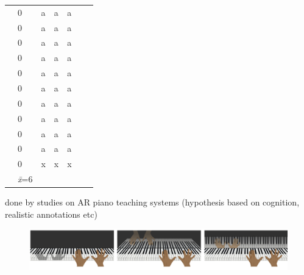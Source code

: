 \documentclass[manuscript,screen]{acmart}
\begin{document}
\begin{table}[]
{\begin{tabular}{lllllll}
\cite{xiao2010mirrorfugue}          & 0                 & a                         & a                             & a                    \\
\cite{xiao2013mirrorfugue}          & 0                 & a                         & a                             & a                    \\
\cite{li2018application}            & 0                 & a                         & a                             & a                    \\
\cite{leonard2013virtual}           & 0                 & a                         & a                             & a                    \\
\cite{raymaekers2014game}           & 0                 & a                         & a                             & a                    \\
\cite{rogers2014piano}              & 0                 & a                         & a                             & a                    \\
\cite{sun2018mr}                    & 0                 & a                         & a                             & a                    \\
\cite{molloy2019mixed}              & 0                 & a                         & a                             & a                    \\
\cite{pan2018pilot}                 & 0                 & a                         & a                             & a                    \\
\cite{kim2014ar}                    & 0                 & a                         & a                             & a                    \\
\cite{xiao2011duet}                 & 0                 & x                         & x                             & x                   \\ \hline 
                                    & \textit{\={x}}=6      &                      &                               &                   \\ \hline \hline 
\end{tabular}%
}
\end{table}

done by studies on AR piano teaching systems (hypothesis based on cognition, realistic annotations etc)


\begin{figure}
    \centering
    \includegraphics[width=15cm]{figures/xiaomirror3interfaces.png}
    \caption{\cite{xiao2010mirrorfugue} }
    \label{fig:xiaomirror3interfaces}
\end{figure}
\end{document}
